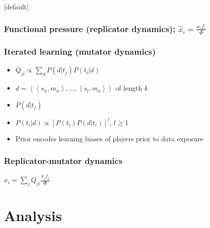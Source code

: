 \documentclass{beamer} %
\makeatletter
\newcommand{\tuple}[1]{\ensuremath{\left\langle #1 \right\rangle}}
\newenvironment{withoutheadline}{
        \setbeamertemplate{headline}[default]
        \def\beamer@entrycode{\vspace*{-\headheight}}
    }{}
\makeatother
\begin{document}
\begin{withoutheadline}
\begin{frame} 
	\frametitle{Functional pressure (replicator dynamics); $\hat{x}_i = \frac{x_i f_i}{\Phi}$
}
\begin{center}
\resizebox{!}{.7\paperheight}{}
\end{center}
%
%
\end{frame}

\begin{frame}
	\frametitle{Iterated learning (mutator dynamics)}
\begin{itemize} \itemsep1em
		\item $Q_{ji} \propto \sum_d P(d|t_j)P(t_i|d)$
		\item $d = \tuple{\tuple{s_h,m_n}, ..., \tuple{s_l,m_o}}$ of length $k$
		\item $P(d|t_j)$ 
		\item $P(t_i|d) \propto [P(t_i)P(d|t_i)]^l$, $l \geq 1$
		\item Prior encodes learning biases of players prior to data exposure%
\end{itemize}
\end{frame}

\begin{frame}
	\frametitle{Replicator-mutator dynamics}
\begin{center}
$\hat{x}_i = \sum_j Q_{ji} \frac{x_j f_j}{\Phi}$
\end{center}
\end{frame}


\section{Analysis}




\end{withoutheadline}
\end{document}
